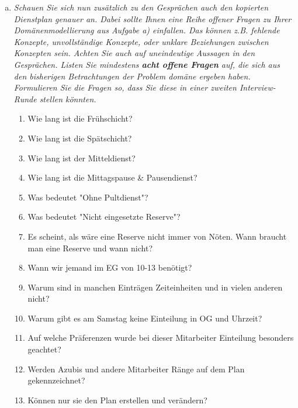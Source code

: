 \begin{enumerate} [a)]
    \item {\itshape Schauen Sie sich nun zusätzlich zu den Gesprächen auch den kopierten Dienstplan genauer an. Dabei sollte Ihnen eine Reihe offener Fragen zu Ihrer Domänenmodellierung aus Aufgabe a) einfallen. Das können z.B. fehlende Konzepte, unvollständige Konzepte, oder unklare Beziehungen zwischen Konzepten sein. Achten Sie auch auf uneindeutige Aussagen in den Gesprächen. Listen Sie mindestens \textbf{acht offene Fragen} auf, die sich aus den bisherigen Betrachtungen der Problem domäne ergeben haben. Formulieren Sie die Fragen so, dass Sie diese in einer zweiten Interview-Runde stellen könnten.}
    
    \begin{enumerate}[1.]
        \item Wie lang ist die Frühschicht?
        \item Wie lang ist die Spätschicht?
        \item Wie lang ist der Mitteldienst?
        \item Wie lang ist die Mittagspause & Pausendienst?
        \item Was bedeutet "{}Ohne Pultdienst"?
        \item Was bedeutet "Nicht eingesetzte Reserve"?
        \item Es scheint, als wäre eine Reserve nicht immer von Nöten. Wann braucht man eine Reserve und wann nicht?
        \item Wann wir jemand im EG von 10-13 benötigt?
        \item Warum sind in manchen Einträgen Zeiteinheiten und in vielen anderen nicht?
        \item Warum gibt es am Samstag keine Einteilung in OG und Uhrzeit?
        \item Auf welche Präferenzen wurde bei dieser Mitarbeiter Einteilung besonders geachtet?
        \item Werden Azubis und andere Mitarbeiter Ränge auf dem Plan gekennzeichnet?
        \item Können nur sie den Plan erstellen und verändern?
        
    \end{enumerate}
    

\end{enumerate}
